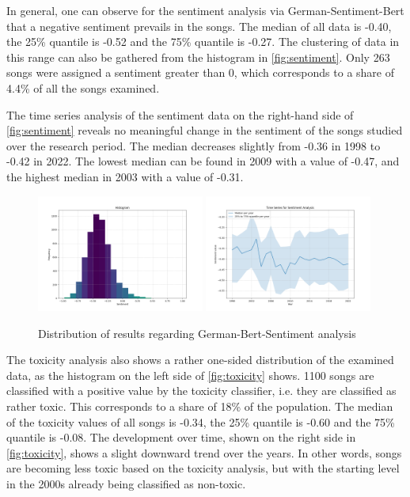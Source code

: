 In general, one can observe for the sentiment analysis via German-Sentiment-Bert that a negative sentiment prevails in the songs. The median of all data is -0.40, the 25\% quantile is -0.52 and the 75\% quantile is -0.27. The clustering of data in this range can also be gathered from the histogram in \autoref{fig:sentiment}. Only 263 songs were assigned a sentiment greater than 0, which corresponds to a share of 4.4\% of all the songs examined. 

The time series analysis of the sentiment data on the right-hand side of \autoref{fig:sentiment} reveals no meaningful change in the sentiment of the songs studied over the research period. The median decreases slightly from -0.36 in 1998 to -0.42 in 2022. The lowest median can be found in 2009 with a value of -0.47, and the highest median in 2003 with a value of -0.31.

\begin{figure}[!htb]
    \centering
    \includegraphics[width=0.49\textwidth]{figures/sentiment_histogram.png}
    \includegraphics[width=0.49\textwidth]{figures/time_series_sentiment.png}
    \caption{Distribution of results regarding German-Bert-Sentiment analysis}
    \label{fig:sentiment}
\end{figure}

The toxicity analysis also shows a rather one-sided distribution of the examined data, as the histogram on the left side of \autoref{fig:toxicity} shows. 1100 songs are classified with a positive value by the toxicity classifier, i.e. they are classified as rather toxic. This corresponds to a share of 18\% of the population. The median of the toxicity values of all songs is -0.34, the 25\% quantile is -0.60 and the 75\% quantile is -0.08. The development over time, shown on the right side in \autoref{fig:toxicity}, shows a slight downward trend over the years. In other words, songs are becoming less toxic based on the toxicity analysis, but with the starting level in the 2000s already being classified as non-toxic.


